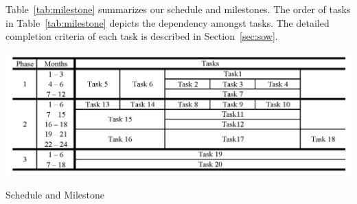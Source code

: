 Table~\ref{tab:milestone} summarizes our schedule and milestones.
The order of tasks in Table~\ref{tab:milestone} depicts the dependency amongst tasks.
The detailed completion criteria of each task is described in Section~\ref{sec:sow}.

\begin{table}[h]
\center
\includegraphics[width=0.7\linewidth]{fig/milestone.png}
\caption{Schedule and Milestone}
\label{tab:milestone}
\end{table}

